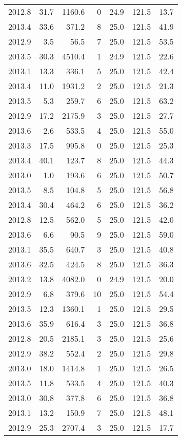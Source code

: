 \begin{tabular}{rrrrrrr}
2012.8 & 31.7 & 1160.6 & 0 & 24.9 & 121.5 & 13.7 \\
2013.4 & 33.6 & 371.2 & 8 & 25.0 & 121.5 & 41.9 \\
2012.9 & 3.5 & 56.5 & 7 & 25.0 & 121.5 & 53.5 \\
2013.5 & 30.3 & 4510.4 & 1 & 24.9 & 121.5 & 22.6 \\
2013.1 & 13.3 & 336.1 & 5 & 25.0 & 121.5 & 42.4 \\
2013.4 & 11.0 & 1931.2 & 2 & 25.0 & 121.5 & 21.3 \\
2013.5 & 5.3 & 259.7 & 6 & 25.0 & 121.5 & 63.2 \\
2012.9 & 17.2 & 2175.9 & 3 & 25.0 & 121.5 & 27.7 \\
2013.6 & 2.6 & 533.5 & 4 & 25.0 & 121.5 & 55.0 \\
2013.3 & 17.5 & 995.8 & 0 & 25.0 & 121.5 & 25.3 \\
2013.4 & 40.1 & 123.7 & 8 & 25.0 & 121.5 & 44.3 \\
2013.0 & 1.0 & 193.6 & 6 & 25.0 & 121.5 & 50.7 \\
2013.5 & 8.5 & 104.8 & 5 & 25.0 & 121.5 & 56.8 \\
2013.4 & 30.4 & 464.2 & 6 & 25.0 & 121.5 & 36.2 \\
2012.8 & 12.5 & 562.0 & 5 & 25.0 & 121.5 & 42.0 \\
2013.6 & 6.6 & 90.5 & 9 & 25.0 & 121.5 & 59.0 \\
2013.1 & 35.5 & 640.7 & 3 & 25.0 & 121.5 & 40.8 \\
2013.6 & 32.5 & 424.5 & 8 & 25.0 & 121.5 & 36.3 \\
2013.2 & 13.8 & 4082.0 & 0 & 24.9 & 121.5 & 20.0 \\
2012.9 & 6.8 & 379.6 & 10 & 25.0 & 121.5 & 54.4 \\
2013.5 & 12.3 & 1360.1 & 1 & 25.0 & 121.5 & 29.5 \\
2013.6 & 35.9 & 616.4 & 3 & 25.0 & 121.5 & 36.8 \\
2012.8 & 20.5 & 2185.1 & 3 & 25.0 & 121.5 & 25.6 \\
2012.9 & 38.2 & 552.4 & 2 & 25.0 & 121.5 & 29.8 \\
2013.0 & 18.0 & 1414.8 & 1 & 25.0 & 121.5 & 26.5 \\
2013.5 & 11.8 & 533.5 & 4 & 25.0 & 121.5 & 40.3 \\
2013.0 & 30.8 & 377.8 & 6 & 25.0 & 121.5 & 36.8 \\
2013.1 & 13.2 & 150.9 & 7 & 25.0 & 121.5 & 48.1 \\
2012.9 & 25.3 & 2707.4 & 3 & 25.0 & 121.5 & 17.7 \\

\end{tabular}
